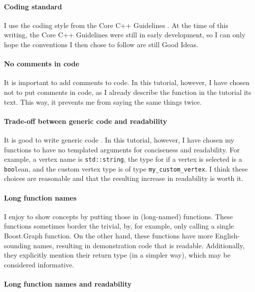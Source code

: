\paragraph{Coding standard}

I use the coding style from the Core C++ Guidelines .
At the time of this writing, the Core C++ Guidelines were still in early
development, so I can only hope the conventions I then chose to follow
are still Good Ideas.

\paragraph{No comments in code}

It is important to add comments to code.
In this tutorial, however, I have chosen not to put comments in code, 
as I already describe the function in the tutorial its text.
This way, it prevents me from saying the same things twice.

\paragraph{Trade-off between generic code and readability}

It is good to write generic code .
In this tutorial, however, I have chosen my functions to have 
no templated arguments  for conciseness and readability.
For example, a vertex name is \verb;std::string;, 
the type for if a vertex is selected is a \verb;bool;ean, 
and the custom vertex type is of type \verb;my_custom_vertex;.
I think these choices are reasonable and that the resulting increase in
readability is worth it.

\paragraph{Long function names}

I enjoy to show concepts by putting those in (long-named) functions.
These functions sometimes border the trivial, by, for example, only calling
a single Boost.Graph function.
On the other hand, these functions have more English-sounding names, resulting
in demonstration code that is readable.
Additionally, they explicitly mention their return type (in a simpler way),
which may be considered informative.

\paragraph{Long function names and readability}

